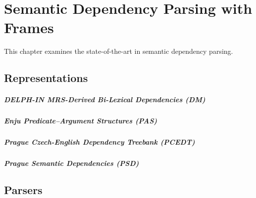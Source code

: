 \chapter{Semantic Dependency Parsing with Frames}
\label{chap:semantic}

This chapter examines the state-of-the-art in semantic dependency parsing. 


\section{Representations}
\label{sec:representations}

\paragraph{DELPH-IN MRS-Derived Bi-Lexical Dependencies (DM)} 

\paragraph{Enju Predicate–Argument Structures (PAS)}

\paragraph{Prague Czech-English Dependency Treebank (PCEDT)}

\paragraph{Prague Semantic Dependencies (PSD)}


\section{Parsers}
\label{sec:parsers}

